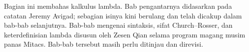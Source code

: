 \documentclass[../../include/open-logic-part]{subfiles}
\begin{document}

\begin{editorial}
Bagian ini membahas kalkulus lambda. Bab pengantarnya didasarkan pada
catatan Jeremy Avigad; sebagian isinya kini berulang dan telah dicakup dalam
bab-bab selanjutnya. Bab-bab mengenai sintaksis, sifat Church--Rosser, dan
keterdefinisian lambda disusun oleh Zesen Qian selama program magang musim
panas Mitacs. Bab-bab tersebut masih perlu ditinjau dan direvisi.
\end{editorial}





\OLEndPartHook
\end{document}
